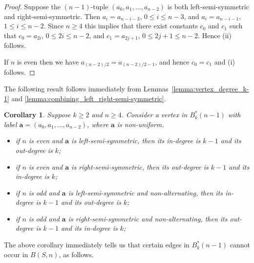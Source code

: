 \documentclass[a4paper,11pt]{article}
\newtheorem{corollary}[lemma]{Corollary}
\begin{document}
\begin{proof}
Suppose the $(n-1)$-tuple $(a_0,a_1,\ldots,a_{n-2})$ is both left-semi-symmetric and
right-semi-symmetric.  Then $a_i=a_{n-i-3}$, $0\leq i\leq n-3$, and $a_i=a_{n-i-1}$, $1\leq i\leq
n-2$.  Since $n\geq4$ this implies that there exist constants $c_0$ and $c_1$ such that
$c_0=a_{2i}$, $0\leq 2i\leq n-2$, and $c_1=a_{2j+1}$, $0\leq 2j+1\leq n-2$.  Hence (ii) follows.

If $n$ is even then we have $a_{(n-2)/2}=a_{(n-2)/2-1}$, and hence $c_0=c_1$ and (i) follows.
\end{proof}

The following result follows immediately from Lemmas~\ref{lemma:vertex_degree_k-1} and
\ref{lemma:combining_left_right-semi-symmetric}.

\begin{corollary}  \label{corollary:left-right-in-out}
Suppose $k\geq2$ and $n\geq4$. Consider a vertex in $B^*_k(n-1)$ with label
$\mathbf{a}=(a_0,a_1,\ldots,a_{n-2})$, where $\mathbf{a}$ is non-uniform.
\begin{itemize}
\item[i)] if $n$ is even and $\mathbf{a}$ is left-semi-symmetric, then its in-degree is $k-1$
    and its out-degree is $k$;
\item[i)] if $n$ is even and $\mathbf{a}$ is right-semi-symmetric, then its out-degree is $k-1$
    and its in-degree is $k$;
\item[iii)] if $n$ is odd and $\mathbf{a}$ is left-semi-symmetric and non-alternating, then its
    in-degree is $k-1$ and its out-degree is $k$;
\item[iv)] if $n$ is odd and $\mathbf{a}$ is right-semi-symmetric and non-alternating, then its
    out-degree is $k-1$ and its in-degree is $k$;
\end{itemize}
\end{corollary}

The above corollary immediately tells us that certain edges in $B^*_k(n-1)$ cannot occur in
$B(S,n)$, as follows.
\end{document}
